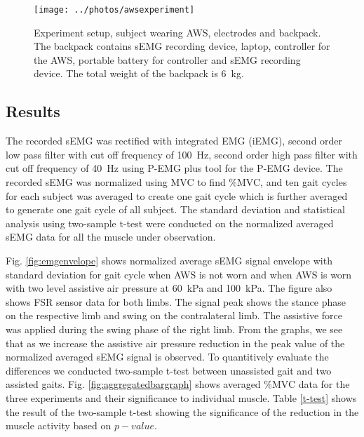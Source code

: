 \documentclass[letterpaper, 10 pt, conference]{ieeeconf}  %
\begin{document}
\begin{figure}
	\centering
	\texttt{[image: ../photos/awsexperiment]}
	\caption{Experiment setup, subject wearing AWS, electrodes and backpack. The backpack contains sEMG recording device, laptop, controller for the AWS, portable battery for controller and sEMG recording device. The total weight of the backpack is \SI{6}{\kilogram}.}
	\label{fig:experimentsetup}
\end{figure}

\subsection{Results}

The recorded sEMG was rectified with integrated EMG (iEMG), second order low pass filter with cut off frequency of \SI{100}{\hertz}, second order high pass filter with cut off frequency of \SI{40}{\hertz} using P-EMG plus tool for the P-EMG device. The recorded sEMG was normalized using MVC to find \%MVC, and ten gait cycles for each subject was averaged to create one gait cycle which is further averaged to generate one gait cycle of all subject. The standard deviation and statistical analysis using two-sample t-test were conducted on the normalized averaged sEMG data for all the muscle under observation.

Fig. \ref{fig:emgenvelope} shows normalized average sEMG signal envelope with standard deviation for gait cycle when AWS is not worn and when AWS is worn with two level assistive air pressure at \SI{60}{\kilo\pascal} and \SI{100}{\kilo\pascal}. The figure also shows FSR sensor data for both limbs. The signal peak shows the stance phase on the respective limb and swing on the contralateral limb. The assistive force was applied during the swing phase of the right limb. From the graphs, we see that as we increase the assistive air pressure reduction in the peak value of the normalized averaged sEMG signal is observed. To quantitively evaluate the differences we conducted two-sample t-test between unassisted gait and two assisted gaits. Fig. \ref{fig:aggregatedbargraph} shows averaged \%MVC data for the three experiments and their significance to individual muscle. Table \ref{t-test} shows the result of the two-sample t-test showing the significance of the reduction in the muscle activity based on $p-value$. 
\end{document}
